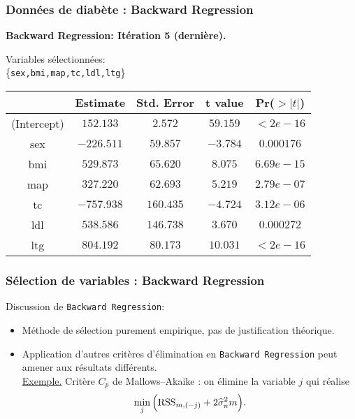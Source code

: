 \documentclass{beamer}
\begin{document}
\begin{frame}
\frametitle{Données de diab\`ete : Backward Regression}

\centerline{\bf Backward Regression: Itération 5 (derni\`ere).}


\begin{center}

Variables sélectionnées:\\\vspace{2mm}
\{\texttt{sex,bmi,map,\alert{tc,ldl},ltg}\}


\vspace{4mm}

{\small
\begin{tabular}{|c||c|c|c|c|}
\hline &Estimate&Std. Error&t value&Pr($>|t|$)\\\hline (Intercept)
&$152.133$&$2.572$&$59.159$&$< 2e-16$
\\\hline
sex &$-226.511$&$59.857$&$-3.784$&$0.000176$\\
bmi&$529.873$&$65.620$&$8.075$&$6.69e-15$\\\hline
map&$327.220$&$62.693$&$5.219$&$2.79e-07$\\
tc&$-757.938$&$160.435$&$-4.724$&$3.12e-06$\\\hline
ldl&$538.586$&$146.738$&$3.670$&$0.000272$\\
ltg&$804.192$&$80.173$&$10.031$&$< 2e-16$\\\hline
\end{tabular}
}
\end{center}
\end{frame}

\begin{frame}
\frametitle{Sélection de variables : Backward Regression}

Discussion de \texttt{Backward Regression}:

\begin{itemize}
\item Méthode de sélection purement empirique, pas de justification
théorique.
\item Application d'autres crit\`eres d'élimination en
\texttt{Backward Regression} peut amener aux résultats différents.\\
\underline{Exemple.} \alert{Crit\`ere $C_p$} de Mallows--Akaike
: on élimine la variable $j$ qui réalise
$$
\min_j \Big({\rm RSS}_{m, (-j)} + 2\widehat\sigma^2_n m\Big).
$$
\end{itemize}
\end{frame}
\end{document}
